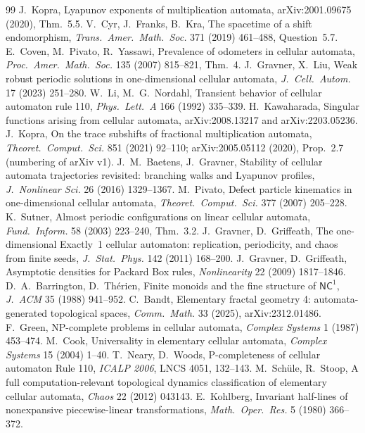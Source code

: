 \documentclass[11pt]{article}
\theoremstyle{definition}
\theoremstyle{remark}
\begin{document}
\begin{thebibliography}{99}
 J.~Kopra, Lyapunov exponents of multiplication automata, arXiv:2001.09675 (2020), Thm.~5.5.
 V.~Cyr, J.~Franks, B.~Kra, The spacetime of a shift endomorphism, \emph{Trans.\ Amer.\ Math.\ Soc.} 371 (2019) 461--488, Question~5.7.
 E.~Coven, M.~Pivato, R.~Yassawi, Prevalence of odometers in cellular automata, \emph{Proc.\ Amer.\ Math.\ Soc.} 135 (2007) 815--821, Thm.~4.
 J.~Gravner, X.~Liu, Weak robust periodic solutions in one-dimensional cellular automata, \emph{J.~Cell.\ Autom.} 17 (2023) 251--280.
 W.~Li, M.~G.~Nordahl, Transient behavior of cellular automaton rule 110, \emph{Phys.\ Lett.\ A} 166 (1992) 335--339.
 H.~Kawaharada, Singular functions arising from cellular automata, arXiv:2008.13217 and arXiv:2203.05236.
 J.~Kopra, On the trace subshifts of fractional multiplication automata, \emph{Theoret.\ Comput.\ Sci.} 851 (2021) 92--110; arXiv:2005.05112 (2020), Prop.~2.7 (numbering of arXiv v1).
 J.~M.~Baetens, J.~Gravner, Stability of cellular automata trajectories revisited: branching walks and Lyapunov profiles, \emph{J.~Nonlinear Sci.} 26 (2016) 1329--1367.
 M.~Pivato, Defect particle kinematics in one-dimensional cellular automata, \emph{Theoret.\ Comput.\ Sci.} 377 (2007) 205--228.
 K.~Sutner, Almost periodic configurations on linear cellular automata, \emph{Fund.\ Inform.} 58 (2003) 223--240, Thm.~3.2.
 J.~Gravner, D.~Griffeath, The one-dimensional Exactly~1 cellular automaton: replication, periodicity, and chaos from finite seeds, \emph{J.~Stat.\ Phys.} 142 (2011) 168--200.
 J.~Gravner, D.~Griffeath, Asymptotic densities for Packard Box rules, \emph{Nonlinearity} 22 (2009) 1817--1846.
 D.~A.~Barrington, D.~Th\'erien, Finite monoids and the fine structure of $\mathsf{NC}^1$, \emph{J.~ACM} 35 (1988) 941--952.
 C.~Bandt, Elementary fractal geometry 4: automata-generated topological spaces, \emph{Comm.\ Math.} 33 (2025), arXiv:2312.01486.
 F.~Green, NP-complete problems in cellular automata, \emph{Complex Systems} 1 (1987) 453--474.
 M.~Cook, Universality in elementary cellular automata, \emph{Complex Systems} 15 (2004) 1--40.
 T.~Neary, D.~Woods, P-completeness of cellular automaton Rule 110, \emph{ICALP 2006}, LNCS 4051, 132--143.
 M.~Sch\"ule, R.~Stoop, A full computation-relevant topological dynamics classification of elementary cellular automata, \emph{Chaos} 22 (2012) 043143.
 E.~Kohlberg, Invariant half-lines of nonexpansive piecewise-linear transformations, \emph{Math.\ Oper.\ Res.} 5 (1980) 366--372.

\end{thebibliography}
\end{document}
